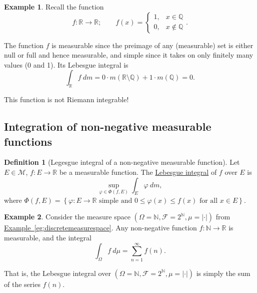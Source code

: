 \documentclass[a4paper,12pt]{scrreprt}
\newcommand{\R}{\mathbb{R}}
\newcommand{\Q}{\mathbb{Q}}
\newcommand{\N}{\mathbb{N}}
\newcommand{\defn}[1]{\ul{#1}}
\newcommand{\abs}[1]{\left|#1\right|}
\theoremstyle{definition}
\newtheorem{definition}{Definition}[section]
\newtheorem{example}{Example}[section]
\theoremstyle{plain}
\theoremstyle{remark}
\begin{document}
\begin{example}
  Recall the function
  \begin{equation*}
    f\colon \R \to \R;\qquad f(x) =
    \begin{cases}
      1, &x \in \Q \\
      0, &x \notin \Q
    \end{cases}.
  \end{equation*}

  The function $f$ is measurable since the preimage of any (measurable) set is either null or full and hence measurable, and simple since it takes on only finitely many values (0 and 1). Its Lebesgue integral is
  \begin{equation*}
    \int_{\R} f\ dm = 0\cdot m(\R \setminus \Q) + 1 \cdot m(\Q) = 0.
  \end{equation*}

  This function is not Riemann integrable!
\end{example}

\subsection{Integration of non-negative measurable functions}
\begin{definition}[Legesgue integral of a non-negative measurable function]
  \label{def:lebesgueintegralofnonnegativemeasurablefunction}
  Let $E \in \mathcal{M}$, $f\colon E \to \R$ be a measurable function. The \defn{Lebesgue integral} of $f$ over $E$ is
  \begin{equation*}
    \sup_{\varphi \in \Phi(f, E)} \int_{E} \varphi\ dm,
  \end{equation*}
  where $\Phi(f, E) = \left\{ \varphi\colon E \to \R \text{ simple and }0 \leq \varphi(x) \leq f(x)\text{ for all }x \in E \right\}$.
\end{definition}

\begin{example}
  \label{eg:lebesgueintegralcanbesum}
  Consider the measure space $(\Omega = \N, \mathcal{F} = 2^{\N}, \mu = \abs{\cdot})$ from \hyperref[eg:discretemeasurespace]{Example~\ref*{eg:discretemeasurespace}}. Any non-negative function $f\colon \N \to \R$ is measurable, and the integral
  \begin{equation*}
    \int_{\Omega} f\ d\mu = \sum_{n = 1}^{\infty} f(n).
  \end{equation*}

  That is, the Lebesgue integral over $(\Omega = \N, \mathcal{F} = 2^{\N}, \mu = \abs{\cdot})$ is simply the sum of the series $f(n)$.
\end{example}
\end{document}
